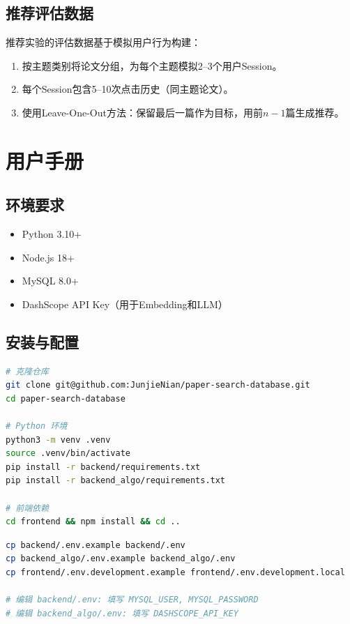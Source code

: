\documentclass[12pt,a4paper]{ctexart}
\begin{document}
\subsection{推荐评估数据}

推荐实验的评估数据基于模拟用户行为构建：
\begin{enumerate}
\item 按主题类别将论文分组，为每个主题模拟2--3个用户Session。
\item 每个Session包含5--10次点击历史（同主题论文）。
\item 使用Leave-One-Out方法：保留最后一篇作为目标，用前$n-1$篇生成推荐。
\end{enumerate}


\section{用户手册}

\subsection{环境要求}

\begin{itemize}
\item Python 3.10+
\item Node.js 18+
\item MySQL 8.0+
\item DashScope API Key（用于Embedding和LLM）
\end{itemize}

\subsection{安装与配置}

\begin{lstlisting}[language=bash, caption=安装依赖]
# 克隆仓库
git clone git@github.com:JunjieNian/paper-search-database.git
cd paper-search-database

# Python 环境
python3 -m venv .venv
source .venv/bin/activate
pip install -r backend/requirements.txt
pip install -r backend_algo/requirements.txt

# 前端依赖
cd frontend && npm install && cd ..
\end{lstlisting}

\begin{lstlisting}[language=bash, caption=配置环境变量]
cp backend/.env.example backend/.env
cp backend_algo/.env.example backend_algo/.env
cp frontend/.env.development.example frontend/.env.development.local

# 编辑 backend/.env: 填写 MYSQL_USER, MYSQL_PASSWORD
# 编辑 backend_algo/.env: 填写 DASHSCOPE_API_KEY
\end{lstlisting}
\end{document}
